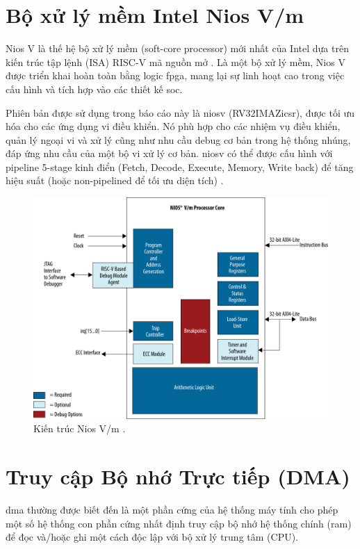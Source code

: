\section{Bộ xử lý mềm Intel Nios V/m}
Nios V là thế hệ bộ xử lý mềm (soft-core processor) mới nhất của Intel dựa trên kiến trúc tập lệnh (ISA) RISC-V mã nguồn mở \cite{intelNiosVHandbook, niosv-reference-manual, altera_nios_v_2024}. Là một bộ xử lý mềm, Nios V được triển khai hoàn toàn bằng logic \acrshort{fpga}, mang lại sự linh hoạt cao trong việc cấu hình và tích hợp vào các thiết kế \acrshort{soc}.

Phiên bản được sử dụng trong báo cáo này là \acrlong{niosv} (RV32IMAZicsr), được tối ưu hóa cho các ứng dụng vi điều khiển. Nó phù hợp cho các nhiệm vụ điều khiển, quản lý ngoại vi và xử lý cũng như nhu cầu debug cơ bản trong hệ thống nhúng, đáp ứng nhu cầu của một bộ vi xử lý cơ bản. \acrlong{niosv} có thể được cấu hình với pipeline 5-stage kinh điển (Fetch, Decode, Execute, Memory, Write back) để tăng hiệu suất (hoặc non-pipelined để tối ưu diện tích) \cite{niosv-reference-manual}.
    
\begin{figure}[htbp]
    \centering
    \includegraphics[width=0.8\linewidth]{Images/02_00_NiosVm_Architecture.pdf}
    \caption{Kiến trúc Nios V/m \cite{niosv-reference-manual}.}
    \label{fig:02_00_NiosVm_Architecture}
\end{figure}

\section{Truy cập Bộ nhớ Trực tiếp (DMA)}

\acrfull{dma} thường được biết đến là một phần cứng của hệ thống máy tính cho phép một số hệ thống con phần cứng nhất định truy cập bộ nhớ hệ thống chính (\acrshort{ram}) để đọc và/hoặc ghi một cách độc lập với bộ xử lý trung tâm (CPU).

